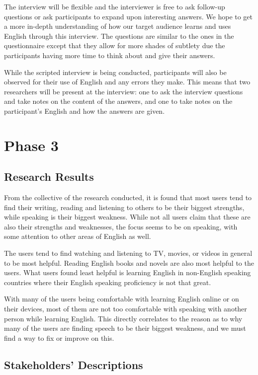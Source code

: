 \documentclass{sigchi}
\begin{document}
The interview will be flexible and the interviewer is free to ask follow-up 
questions or ask participants to expand upon interesting answers. We hope to get
a more in-depth understanding of how our target audience learns and uses English
through this interview. The questions are similar to the ones in the 
questionnaire except that they allow for more shades of subtlety due the 
participants having more time to think about and give their answers.

While the scripted interview is being conducted, participants will also be 
observed for their use of English and any errors they make. This means that two 
researchers will be present at the interview: one to ask the interview questions 
and take notes on the content of the answers, and one to take notes on the 
participant’s English and how the answers are given.

\section{Phase 3}
\subsection{Research Results}
From the collective of the research conducted, it is found that most users tend to find their writing, reading and listening to others to be their biggest strengths, while speaking is their biggest weakness. While not all users claim that these are also their strengths and weaknesses, the focus seems to be on speaking, with some attention to other areas of English as well.

The users tend to find watching and listening to TV, movies, or videos in general to be most helpful. Reading English books and novels are also most helpful to the users. What users found least helpful is learning English in non-English speaking countries where their English speaking proficiency is not that great.

With many of the users being comfortable with learning English online or on their devices, most of them are not too comfortable with speaking with another person while learning English. This directly correlates to the reason as to why many of the users are finding speech to be their biggest weakness, and we must find a way to fix or improve on this.

\subsection{Stakeholders’ Descriptions}
\end{document}
